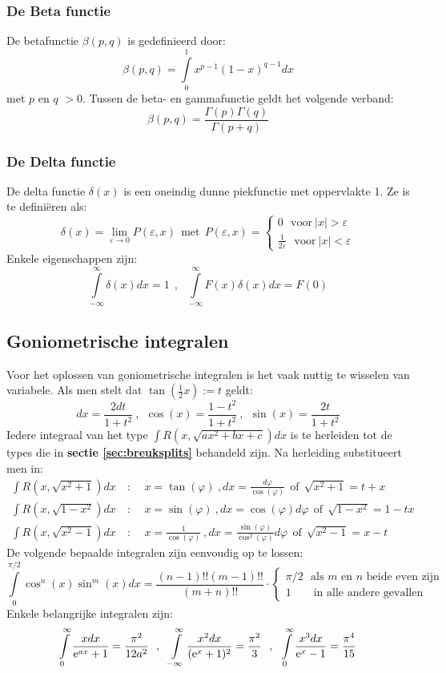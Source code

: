 \subsubsection{De Beta functie}
De betafunctie $\beta(p,q)$ is gedefinieerd door:
\[
\beta(p,q)=\int\limits_0^1x^{p-1}(1-x)^{q-1}dx
\]
met $p$ en $q$ $>0$. Tussen de beta- en gammafunctie geldt het volgende
verband:
\[
\beta(p,q)=\frac{\Gamma(p)\Gamma(q)}{\Gamma(p+q)}
\]

\subsubsection{De Delta functie}
De delta functie $\delta(x)$ is een oneindig dunne piekfunctie met oppervlakte
1. Ze is te defini\"eren als:
\[
\delta(x)=\lim_{\varepsilon\rightarrow0}P(\varepsilon,x)~~\mbox{met}~~
P(\varepsilon,x)=\left\{
\begin{array}{l}
0~~~\mbox{voor}~|x|>\varepsilon\\
\displaystyle\frac{1}{2\varepsilon}~~~\mbox{voor}~|x|<\varepsilon
\end{array}\right.
\]
Enkele eigenschappen zijn:
\[
\int\limits_{-\infty}^\infty\delta(x)dx=1~~,~~~
\int\limits_{-\infty}^\infty F(x)\delta(x)dx=F(0)
\]

\subsection{Goniometrische integralen}
Voor het oplossen van goniometrische integralen is het vaak nuttig te wisselen
van variabele. Als men stelt dat $\tan(\frac{1}{2}x):=t$ geldt:
\[
dx=\frac{2dt}{1+t^2}~,~~\cos(x)=\frac{1-t^2}{1+t^2}~,~~\sin(x)=\frac{2t}{1+t^2}
\]
Iedere integraal van het type $\int R(x,\sqrt{ax^2+bx+c})dx$ is te herleiden
tot de types die in {\bf sectie \ref{sec:breuksplits}} behandeld zijn. Na
herleiding substitueert men in:
\begin{eqnarray*}
\int R(x,\sqrt{x^2+1})dx&~:~~&x=\tan(\varphi)          ~,dx=\frac{d\varphi}{\cos(\varphi)}               ~~\mbox{of}~~\sqrt{x^2+1}=t+x\\
\int R(x,\sqrt{1-x^2})dx&~:~~&x=\sin(\varphi)          ~,dx=\cos(\varphi)d\varphi                        ~~\mbox{of}~~\sqrt{1-x^2}=1-tx\\
\int R(x,\sqrt{x^2-1})dx&~:~~&x=\frac{1}{\cos(\varphi)}~,dx=\frac{\sin(\varphi)}{\cos^2(\varphi)}d\varphi~~\mbox{of}~~\sqrt{x^2-1}=x-t
\end{eqnarray*}
De volgende bepaalde integralen zijn eenvoudig op te lossen:
\[
\int\limits_0^{\pi/2}\cos^n(x)\sin^m(x)dx=\frac{(n-1)!!(m-1)!!}{(m+n)!!}\cdot
\left\{\begin{array}{l}
\pi/2\mbox{~~als $m$ en $n$ beide even zijn}\\
1\mbox{~~~~~~in alle andere gevallen}
\end{array}\right.
\]
Enkele belangrijke integralen zijn:
\[
\int\limits_0^\infty\frac{xdx}{{\rm e}^{ax}+1}=\frac{\pi^2}{12a^2}~~,~~
\int\limits_{-\infty}^\infty\frac{x^2dx}{({\rm e}^x+1)^2}=\frac{\pi^2}{3}~~,~~
\int\limits_0^\infty\frac{x^3dx}{{\rm e}^x-1}=\frac{\pi^4}{15}
\]

